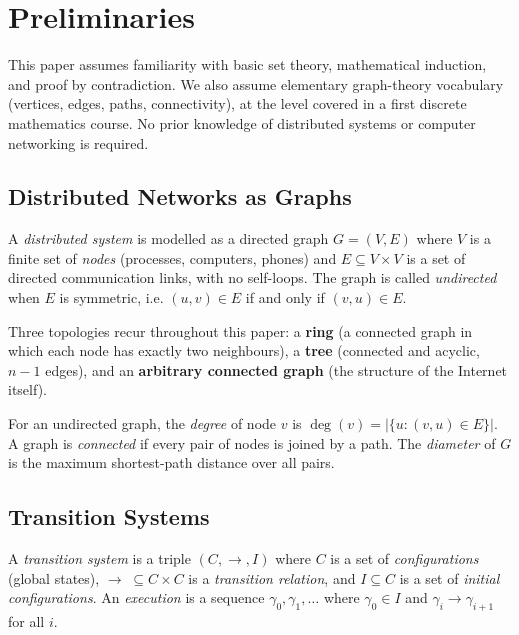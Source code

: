 \section{Preliminaries}\label{sec:prelim}

This paper assumes familiarity with basic set theory, mathematical induction, and proof by contradiction. We also assume elementary graph-theory vocabulary (vertices, edges, paths, connectivity), at the level covered in a first discrete mathematics course. No prior knowledge of distributed systems or computer networking is required.

\subsection{Distributed Networks as Graphs}\label{subsec:network-graph}

\begin{smjdefinition}\label{def:network-graph}
A \emph{distributed system} is modelled as a directed graph $G = (V, E)$ where $V$ is a finite set of \emph{nodes} (processes, computers, phones) and $E \subseteq V \times V$ is a set of directed communication links, with no self-loops. The graph is called \emph{undirected} when $E$ is symmetric, i.e. $(u,v)\in E$ if and only if $(v,u)\in E$.
\end{smjdefinition}

Three topologies recur throughout this paper: a \textbf{ring} (a connected graph in which each node has exactly two neighbours), a \textbf{tree} (connected and acyclic, $n-1$ edges), and an \textbf{arbitrary connected graph} (the structure of the Internet itself).

\begin{smjdefinition}
For an undirected graph, the \emph{degree} of node $v$ is $\deg(v) = |\{u : (v,u)\in E\}|$. A graph is \emph{connected} if every pair of nodes is joined by a path. The \emph{diameter} of $G$ is the maximum shortest-path distance over all pairs.
\end{smjdefinition}

\subsection{Transition Systems}\label{subsec:transition}

\begin{smjdefinition}\label{def:transition-system}
A \emph{transition system} is a triple $(C, \rightarrow, I)$ where $C$ is a set of \emph{configurations} (global states), ${\rightarrow}\;\subseteq C\times C$ is a \emph{transition relation}, and $I\subseteq C$ is a set of \emph{initial configurations}. An \emph{execution} is a sequence $\gamma_0,\gamma_1,\ldots$ where $\gamma_0\in I$ and $\gamma_i\rightarrow\gamma_{i+1}$ for all $i$.
\end{smjdefinition}

